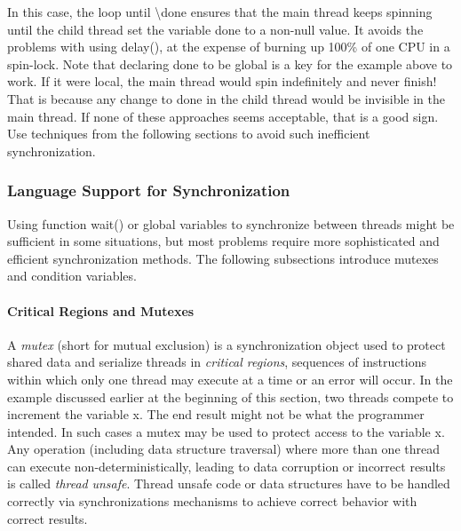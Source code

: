 
In this case, the loop \textsf{until
{\textbackslash}}\textsf{done} ensures that the main thread
keeps spinning until the child thread set the variable
\textsf{done} to a non-null value. It avoids the problems
with using delay(), at the expense of burning up 100\% of one CPU in a
spin-lock. Note that declaring \textsf{done} to be global is
a key for the example above to work. If it were local, the main thread
would spin indefinitely and never finish! That is because any change to
\textsf{done} in the child thread would be invisible in the
main thread. If none of these approaches seems acceptable, that is a
good sign. Use techniques from the following sections to avoid such
inefficient synchronization.

\subsubsection[Language Support for Synchronization]{Language Support
for Synchronization}

Using function wait() or global variables to synchronize between threads
might be sufficient in some situations, but most problems require more
sophisticated and efficient synchronization methods. The following
subsections introduce mutexes and condition variables. \ 

\paragraph{Critical Regions and Mutexes}
A \textit{mutex} (short for mutual exclusion) is a synchronization
object used to protect shared data and serialize threads in
\textit{critical regions}, sequences of instructions within which only
one thread may execute at a time or an error will occur. In the example
discussed earlier at the beginning of this section, two threads compete
to increment the variable x. The end result might not be what the
programmer intended. In such cases a mutex may be used to protect
access to the variable \textsf{x}. Any operation (including
data structure traversal) where more than one thread can execute
non-deterministically, leading to data corruption or incorrect results
is called \textit{thread} \textit{unsafe}. Thread unsafe code or data
structures have to be handled correctly via synchronizations mechanisms
to achieve correct behavior with correct results.

